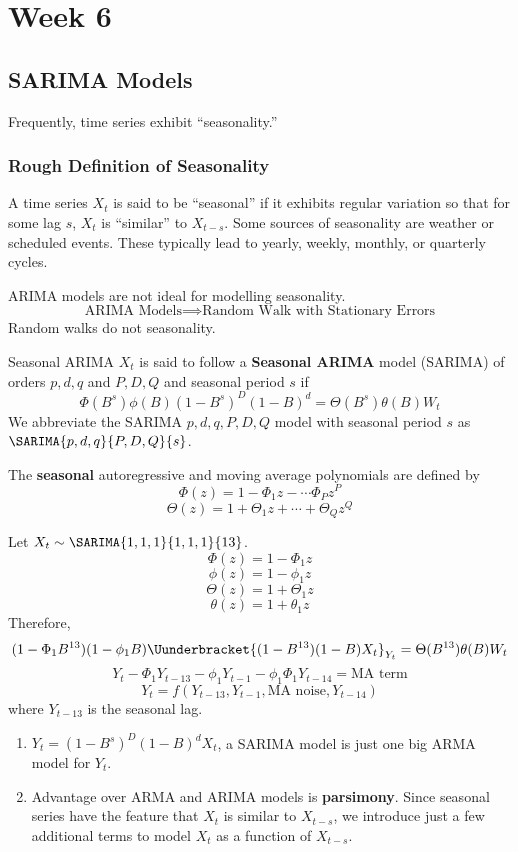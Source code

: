 \chapter{Week 6}
\section{SARIMA Models}
Frequently, time series exhibit ``seasonality.''
\subsection*{Rough Definition of Seasonality}
A time series $ X_t $ is said to be ``seasonal''
if it exhibits regular variation so that for some lag $ s $,
$ X_t $ is ``similar'' to $ X_{t-s} $.
Some sources of seasonality are weather or scheduled events.
These typically lead to yearly, weekly, monthly, or quarterly cycles.
\begin{Remark}{}{}
      ARIMA models are not ideal for modelling seasonality.
      \[ \text{ARIMA Models}\implies\text{Random Walk with Stationary Errors} \]
      Random walks do not seasonality.
\end{Remark}
\begin{Definition}{Seasonal ARIMA}{}
      $ X_t $ is said to follow a \textbf{Seasonal ARIMA} model (SARIMA)
      of orders $ p,d,q $ and $ P,D,Q $ and seasonal period $ s $
      if
      \[ \Phi(B^s)\phi(B)(1-B^s)^D(1-B)^d=\Theta(B^s)\theta(B)W_t \]
      We abbreviate the SARIMA $ p,d,q,P,D,Q $ model with seasonal
      period $ s $ as $ \SARIMA{p,d,q}{P,D,Q}{s} $.
\end{Definition}
\begin{Definition}{}{}
      The \textbf{seasonal} autoregressive and moving average polynomials are
      defined by
      \[ \Phi(z)=1-\Phi_1 z-\cdots \Phi_P z^P \]
      \[ \Theta(z)=1+\Theta_1 z+\cdots+\Theta_Q z^Q \]
\end{Definition}
\begin{Example}{}{}
      Let $ X_t \sim \SARIMA{1,1,1}{1,1,1}{13} $.
      \[ \Phi(z)=1-\Phi_1 z \]
      \[ \phi(z)=1-\phi_1 z \]
      \[ \Theta(z)=1+\Theta_1 z \]
      \[ \theta(z)=1+\theta_1 z \]
      Therefore,
      \[ (1-\Phi_1 B^{13})(1-\phi_1 B)\Uunderbracket{(1-B^{13})(1-B)X_t}_{Y_t}=\Theta(B^{13})\theta(B)W_t \]
      \[ Y_t-\Phi_1 Y_{t-13}-\phi_1 Y_{t-1}-\phi_1 \Phi_1 Y_{t-14}=\text{MA term} \]
      \[ Y_t=f(Y_{t-13},Y_{t-1},\text{MA noise}, Y_{t-14}) \]
      where $ Y_{t-13} $ is the seasonal lag.
\end{Example}
\begin{Remark}{}{}
      \begin{enumerate}[(1)]
            \item $ Y_t=(1-B^s)^D(1-B)^d X_t $, a SARIMA model is just one big ARMA
                  model for $ Y_t $.
            \item Advantage over ARMA and ARIMA models is \textbf{parsimony}.
                  Since seasonal series have the feature that $ X_t $ is similar to $ X_{t-s} $,
                  we introduce just a few additional terms to model $ X_t $ as a function of
                  $ X_{t-s} $.
      \end{enumerate}
\end{Remark}
